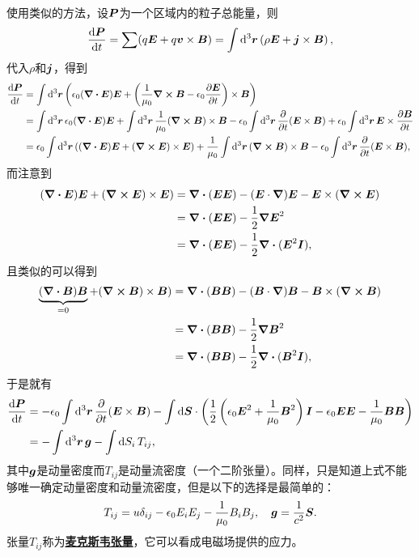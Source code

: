 \documentclass[UTF8, a4paper]{ctexart}
\newcommand*{\concept}[1]{\underline{\textbf{#1}}}
\begin{document}
使用类似的方法，设$\vb*{P}$为一个区域内的粒子总能量，则
\[
    \dv{\vb*{P}}{t} = \sum (q \vb*{E} + q \vb*{v} \times \vb*{B}) = \int \dd[3]{\vb*{r}} \left( \rho \vb*{E} + \vb*{j} \times \vb*{B} \right),
\]
代入$\rho$和$\vb*{j}$，得到
\[
    \begin{aligned}
        \dv{\vb*{P}}{t} &= \int \dd[3]{\vb*{r}} \left(\epsilon_0 (\div{\vb*{E}}) \vb*{E} + \left( \frac{1}{\mu_0} \curl{\vb*{B}} - \epsilon_0 \pdv{\vb*{E}}{t} \right) \times \vb*{B} \right) \\
        &= \int \dd[3]{\vb*{r}} \epsilon_0 (\div{\vb*{E}}) \vb*{E} + \int \dd[3]{\vb*{r}} \frac{1}{\mu_0} (\curl{\vb*{B}}) \times \vb*{B} - \epsilon_0 \int \dd[3]{\vb*{r}} \pdv{t} (\vb*{E} \times \vb*{B}) + \epsilon_0 \int \dd[3]{\vb*{r}} \vb*{E} \times \pdv{\vb*{B}}{t} \\
        &= \epsilon_0 \int \dd[3]{\vb*{r}} ((\div{\vb*{E}}) \vb*{E} + (\curl{\vb*{E}}) \times \vb*{E}) + \frac{1}{\mu_0} \int \dd[3]{\vb*{r}} (\curl{\vb*{B}}) \times \vb*{B} - \epsilon_0 \int \dd[3]{\vb*{r}} \pdv{t} (\vb*{E} \times \vb*{B}),
    \end{aligned}
\]
而注意到
\[
    \begin{aligned}
        (\div{\vb*{E}}) \vb*{E} + (\curl{\vb*{E}}) \times \vb*{E}) &= \div{(\vb*{E} \vb*{E})} - (\vb*{E} \cdot \grad) \vb*{E} - \vb*{E} \times (\curl{\vb*{E}}) \\
        &= \div{(\vb*{E} \vb*{E})} - \frac{1}{2} \grad{\vb*{E}^2} \\
        &= \div{(\vb*{E} \vb*{E})} - \frac{1}{2} \div{(\vb*{E}^2 \vb*{I})},
    \end{aligned}
\]
且类似的可以得到
\[
    \begin{aligned}
        \underbrace{(\div{\vb*{B}}) \vb*{B}}_{=0} + (\curl{\vb*{B}}) \times \vb*{B}) &= \div{(\vb*{B} \vb*{B})} - (\vb*{B} \cdot \grad) \vb*{B} - \vb*{B} \times (\curl{\vb*{B}}) \\
        &= \div{(\vb*{B} \vb*{B})} - \frac{1}{2} \grad{\vb*{B}^2} \\
        &= \div{(\vb*{B} \vb*{B})} - \frac{1}{2} \div{(\vb*{B}^2 \vb*{I})},
    \end{aligned}
\]
于是就有
\[
    \begin{aligned}
        \dv{\vb*{P}}{t} &= - \epsilon_0 \int \dd[3]{\vb*{r}} \pdv{t} (\vb*{E} \times \vb*{B}) - \int \dd{\vb*{S}} \cdot \left( \frac{1}{2} \left( \epsilon_0 \vb*{E}^2 + \frac{1}{\mu_0} \vb*{B}^2 \right) \vb*{I} - \epsilon_0 \vb*{E} \vb*{E} - \frac{1}{\mu_0} \vb*{B} \vb*{B} \right) \\
        &= - \int \dd[3]{\vb*{r}} \vb*{g} - \int \dd{S_i} T_{ij},
    \end{aligned}
\]
其中$\vb*{g}$是动量密度而$T_{ij}$是动量流密度（一个二阶张量）。同样，只是知道上式不能够唯一确定动量密度和动量流密度，但是以下的选择是最简单的：
\begin{equation}
    T_{ij} = u \delta_{ij} - \epsilon_0 E_i E_j - \frac{1}{\mu_0} B_i B_j, \quad \vb*{g} = \frac{1}{c^2} \vb*{S}.
\end{equation}
张量$T_{ij}$称为\concept{麦克斯韦张量}，它可以看成电磁场提供的应力。
\end{document}
